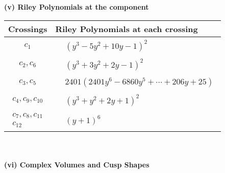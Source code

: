 \documentclass[1p]{elsarticle_modified}
\theoremstyle{definition}
\begin{document}
\flushleft \textbf{(v) Riley Polynomials at the component}\newline \\
\begin{tabular}{m{50pt}|m{274pt}}
Crossings & \hspace{64pt}Riley Polynomials at each crossing \\
\hline $$\begin{aligned}c_{1}\end{aligned}$$&$\begin{aligned}
&(y^3-5 y^2+10 y-1)^2
\end{aligned}$\\
\hline $$\begin{aligned}c_{2},c_{6}\end{aligned}$$&$\begin{aligned}
&(y^3+3 y^2+2 y-1)^2
\end{aligned}$\\
\hline $$\begin{aligned}c_{3},c_{5}\end{aligned}$$&$\begin{aligned}
&2401(2401 y^6-6860 y^5+\cdots+206 y+25)
\end{aligned}$\\
\hline $$\begin{aligned}c_{4},c_{9},c_{10}\end{aligned}$$&$\begin{aligned}
&(y^3+y^2+2 y+1)^2
\end{aligned}$\\
\hline $$\begin{aligned}c_{7},c_{8},c_{11}\\c_{12}\end{aligned}$$&$\begin{aligned}
&(y+1)^6
\end{aligned}$\\
\hline
\end{tabular}\\~\\
\newpage\flushleft \textbf{(vi) Complex Volumes and Cusp Shapes}
\end{document}
